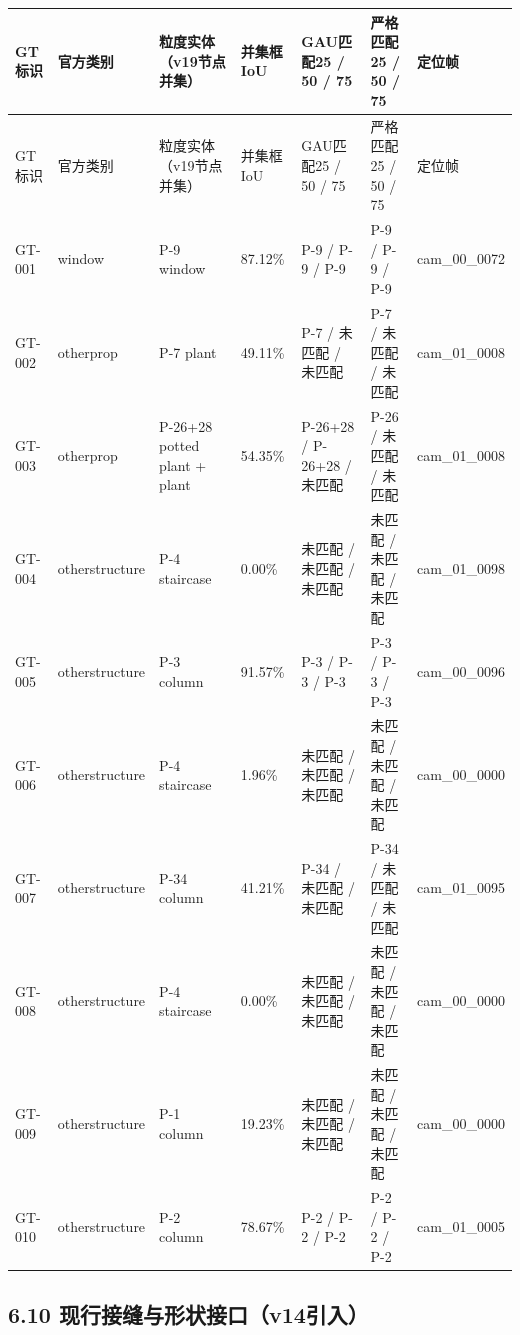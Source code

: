 \documentclass[UTF8,fontset=fandol]{ctexart}
\begin{document}
{\small
\begin{longtable}{|p{}|p{}|p{}|p{}|p{}|p{}|p{}|}
\hline
GT标识 & 官方类别 & 粒度实体（v19节点并集） & 并集框IoU & GAU匹配25 / 50 / 75 & 严格匹配25 / 50 / 75 & 定位帧 \\ \hline
\endfirsthead
\hline
GT标识 & 官方类别 & 粒度实体（v19节点并集） & 并集框IoU & GAU匹配25 / 50 / 75 & 严格匹配25 / 50 / 75 & 定位帧 \\ \hline
\endhead
GT-001 & window & P-9 window & 87.12\% & P-9 / P-9 / P-9 & P-9 / P-9 / P-9 & cam\_00\_0072 \\ \hline
GT-002 & otherprop & P-7 plant & 49.11\% & P-7 / 未匹配 / 未匹配 & P-7 / 未匹配 / 未匹配 & cam\_01\_0008 \\ \hline
GT-003 & otherprop & P-26+28 potted plant + plant & 54.35\% & P-26+28 / P-26+28 / 未匹配 & P-26 / 未匹配 / 未匹配 & cam\_01\_0008 \\ \hline
GT-004 & otherstructure & P-4 staircase & 0.00\% & 未匹配 / 未匹配 / 未匹配 & 未匹配 / 未匹配 / 未匹配 & cam\_01\_0098 \\ \hline
GT-005 & otherstructure & P-3 column & 91.57\% & P-3 / P-3 / P-3 & P-3 / P-3 / P-3 & cam\_00\_0096 \\ \hline
GT-006 & otherstructure & P-4 staircase & 1.96\% & 未匹配 / 未匹配 / 未匹配 & 未匹配 / 未匹配 / 未匹配 & cam\_00\_0000 \\ \hline
GT-007 & otherstructure & P-34 column & 41.21\% & P-34 / 未匹配 / 未匹配 & P-34 / 未匹配 / 未匹配 & cam\_01\_0095 \\ \hline
GT-008 & otherstructure & P-4 staircase & 0.00\% & 未匹配 / 未匹配 / 未匹配 & 未匹配 / 未匹配 / 未匹配 & cam\_00\_0000 \\ \hline
GT-009 & otherstructure & P-1 column & 19.23\% & 未匹配 / 未匹配 / 未匹配 & 未匹配 / 未匹配 / 未匹配 & cam\_00\_0000 \\ \hline
GT-010 & otherstructure & P-2 column & 78.67\% & P-2 / P-2 / P-2 & P-2 / P-2 / P-2 & cam\_01\_0005 \\ \hline
\end{longtable}
}

\subsection*{6.10 现行接缝与形状接口（v14引入）}
\end{document}
